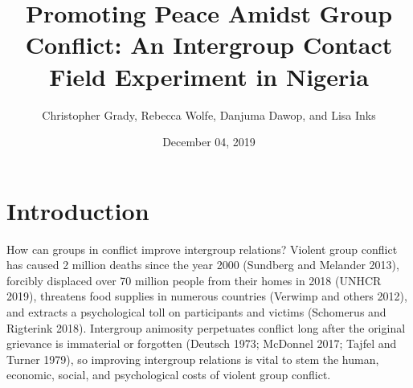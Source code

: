 \documentclass[11pt]{article}
\title{Promoting Peace Amidst Group Conflict: An Intergroup Contact Field
Experiment in Nigeria}
\author{
Christopher Grady, Rebecca Wolfe, Danjuma Dawop, and Lisa Inks
}
\date{December 04, 2019}
\begin{document}
\VerbatimFootnotes

%
%
%
%
%
%
%
%
%
%

\maketitle

\hypertarget{introduction}{%
\section{Introduction}\label{introduction}}

How can groups in conflict improve intergroup relations? Violent group
conflict has caused 2 million deaths since the year 2000 (Sundberg and
Melander 2013), forcibly displaced over 70 million people from their
homes in 2018 (UNHCR 2019), threatens food supplies in numerous
countries (Verwimp and others 2012), and extracts a psychological toll
on participants and victims (Schomerus and Rigterink 2018). Intergroup
animosity perpetuates conflict long after the original grievance is
immaterial or forgotten (Deutsch 1973; McDonnel 2017; Tajfel and Turner
1979), so improving intergroup relations is vital to stem the human,
economic, social, and psychological costs of violent group conflict.
\end{document}
